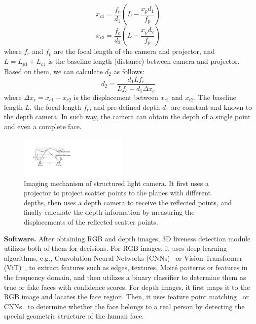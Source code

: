 \begin{equation}
	x_{c1}=\frac{f_c}{d_1}(L-\frac{x_pd_1}{f_p}) 
	\label{xc1_cal}
\end{equation}
\begin{equation}
	x_{c2}=\frac{f_c}{d_2}(L-\frac{x_pd_2}{f_p}) 
	\label{xc2_cal}
\end{equation}
where $f_c$ and $f_p$ are the focal length of the camera and projector, and  $L=L_{p1}+L_{c1}$ is the baseline length (distance) between camera and projector. 
Based on them, we can calculate ${d_2}$ as follows:
\begin{equation}
	d_2= \frac{d_1Lf_c}{Lf_c - d_1\Delta x_c}
	\label{d_cal}
\end{equation}
where $\Delta x_c=x_{c1}-x_{c2}$ is the displacement between $x_{c1}$ and $x_{c2}$. The baseline length $L$, the focal length $f_c$, and pre-defined depth $d_1$ are constant and known to the depth camera. In such way, the camera can obtain the depth of a single point and even a complete face.


\begin{figure}[!t]
	\centering
	\includegraphics[width=0.475\textwidth]{figures/imaging_mechanism.pdf} 
	\vspace{-0.1in}
	\caption{Imaging mechanism of structured light camera. It first uses a projector to project scatter points to the planes with different depths, then uses a depth camera to receive the reflected points, and finally calculate the depth information by measuring the displacements of the reflected scatter points.}
	\label{imaging_mechanism}
	\vspace{-0.15in}
\end{figure}

\textbf{Software.} After obtaining RGB and depth images, 3D liveness detection module utilizes both of them for decisions.
For RGB images, it uses deep learning algorithms, e.g., Convolution Neural Networks (CNNs)~\cite{yang2014learn, chen2020face, luo2018face} or Vision Transformer (ViT)~\cite{george2020effectiveness}, to extract features such as edges, textures, Moiré patterns or features in the frequency domain,  and then utilizes a binary classifier to determine them as true or fake faces with confidence scores.
For depth images, it first maps it to the RGB image and locates the face region. Then, it uses feature point matching~\cite{goswami2014rgb} or CNNs~\cite{george2021cross, te2020exploring} to determine whether the face belongs to a real person by detecting the special geometric structure of the human face. 

